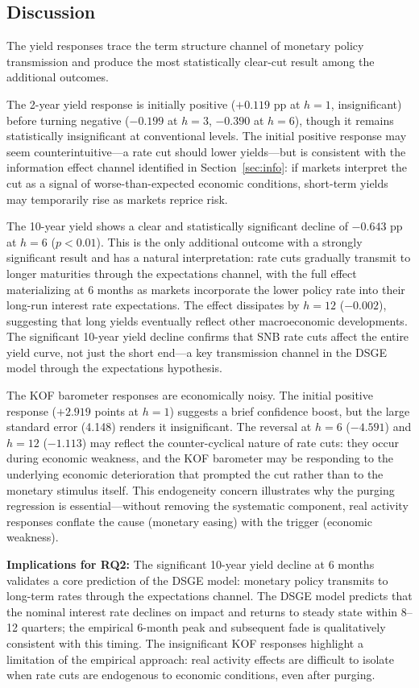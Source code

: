 \documentclass[12pt,a4paper]{article}
\begin{document}
\subsection{Discussion}

The yield responses trace the term structure channel of monetary policy transmission and produce the most statistically clear-cut result among the additional outcomes.

The 2-year yield response is initially positive ($+0.119$ pp at $h=1$, insignificant) before turning negative ($-0.199$ at $h=3$, $-0.390$ at $h=6$), though it remains statistically insignificant at conventional levels. The initial positive response may seem counterintuitive---a rate cut should lower yields---but is consistent with the information effect channel identified in Section~\ref{sec:info}: if markets interpret the cut as a signal of worse-than-expected economic conditions, short-term yields may temporarily rise as markets reprice risk.

The 10-year yield shows a clear and statistically significant decline of $-0.643$ pp at $h=6$ ($p < 0.01$). This is the only additional outcome with a strongly significant result and has a natural interpretation: rate cuts gradually transmit to longer maturities through the expectations channel, with the full effect materializing at 6 months as markets incorporate the lower policy rate into their long-run interest rate expectations. The effect dissipates by $h=12$ ($-0.002$), suggesting that long yields eventually reflect other macroeconomic developments. The significant 10-year yield decline confirms that SNB rate cuts affect the entire yield curve, not just the short end---a key transmission channel in the DSGE model through the expectations hypothesis.

The KOF barometer responses are economically noisy. The initial positive response ($+2.919$ points at $h=1$) suggests a brief confidence boost, but the large standard error (4.148) renders it insignificant. The reversal at $h=6$ ($-4.591$) and $h=12$ ($-1.113$) may reflect the counter-cyclical nature of rate cuts: they occur during economic weakness, and the KOF barometer may be responding to the underlying economic deterioration that prompted the cut rather than to the monetary stimulus itself. This endogeneity concern illustrates why the purging regression is essential---without removing the systematic component, real activity responses conflate the cause (monetary easing) with the trigger (economic weakness).

\textbf{Implications for RQ2:} The significant 10-year yield decline at 6 months validates a core prediction of the DSGE model: monetary policy transmits to long-term rates through the expectations channel. The DSGE model predicts that the nominal interest rate declines on impact and returns to steady state within 8--12 quarters; the empirical 6-month peak and subsequent fade is qualitatively consistent with this timing. The insignificant KOF responses highlight a limitation of the empirical approach: real activity effects are difficult to isolate when rate cuts are endogenous to economic conditions, even after purging.
\end{document}
